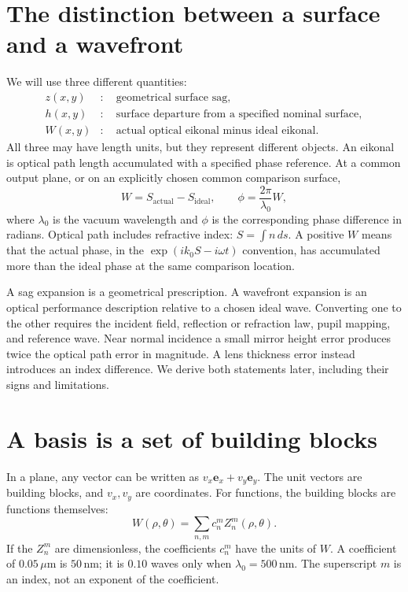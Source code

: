 \section{The distinction between a surface and a wavefront}
We will use three different quantities:
\begin{align}
 z(x,y)&:\quad\text{geometrical surface sag},\\
 h(x,y)&:\quad\text{surface departure from a specified nominal surface},\\
 W(x,y)&:\quad\text{actual optical eikonal minus ideal eikonal}.
\end{align}
All three may have length units, but they represent different objects.
An eikonal is optical path length accumulated with a specified phase
reference. At a common output plane, or on an explicitly chosen common
comparison surface,
\begin{equation}
 W=S_{\mathrm{actual}}-S_{\mathrm{ideal}},\qquad
 \phi=\frac{2\pi}{\lambda_0}W,
 \label{zc:opdconvention}
\end{equation}
where $\lambda_0$ is the vacuum wavelength and $\phi$ is the corresponding
phase difference in radians. Optical path includes refractive index:
$S=\int n\,ds$. A positive $W$ means that the actual phase, in the
$\exp(i k_0 S-i\omega t)$ convention, has accumulated more than the ideal
phase at the same comparison location.

A sag expansion is a geometrical prescription. A wavefront expansion is
an optical performance description relative to a chosen ideal wave.
Converting one to the other requires the incident field, reflection or
refraction law, pupil mapping, and reference wave. Near normal incidence
a small mirror height error produces twice the optical path error in
magnitude. A lens thickness error instead introduces an index difference.
We derive both statements later, including their signs and limitations.

\section{A basis is a set of building blocks}
In a plane, any vector can be written as $v_x\bm e_x+v_y\bm e_y$.
The unit vectors are building blocks, and $v_x,v_y$ are coordinates.
For functions, the building blocks are functions themselves:
\begin{equation}
 W(\rho,\theta)=\sum_{n,m}c_n^m Z_n^m(\rho,\theta).
 \label{zc:expansion}
\end{equation}
If the $Z_n^m$ are dimensionless, the coefficients $c_n^m$ have the units
of $W$. A coefficient of $0.05\,\mu\mathrm m$ is $50\,\mathrm{nm}$;
it is $0.10$ waves only when $\lambda_0=500\,\mathrm{nm}$.
The superscript $m$ is an index, not an exponent of the coefficient.


